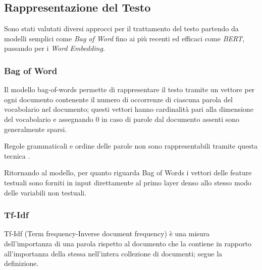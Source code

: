 

\subsection{Rappresentazione del Testo}

Sono stati valutati diversi approcci per il trattamento del testo partendo da
modelli semplici come \textit{Bag of Word} fino ai più recenti ed efficaci come
\textit{BERT}, passando per i \textit{Word Embedding}.

\subsubsection{Bag of Word}
Il modello bag-of-words permette di rappresentare il testo tramite un vettore
per ogni documento contenente il numero di occorrenze di ciascuna parola del
vocabolario nel documento; questi vettori hanno cardinalità pari alla dimensione
del vocabolario e assegnando 0 in caso di parole dal documento assenti sono
generalmente sparsi.

Regole grammaticali e ordine delle parole non sono rappresentabili
tramite questa tecnica \cite{manning_raghavan_schutze_2008}.

Ritornando al modello, per quanto riguarda Bag of Words i vettori delle feature
testuali sono forniti in input direttamente al primo layer denso allo stesso
modo delle variabili non testuali.

\subsubsection{Tf-Idf}\label{section-tfidf} Tf-Idf (Term frequency-Inverse
document frequency) \cite{manning_raghavan_schutze_2008} è una misura
dell'importanza di una parola rispetto al documento che la contiene in rapporto
all'importanza della stessa nell'intera collezione di documenti; segue la
definizione.%


